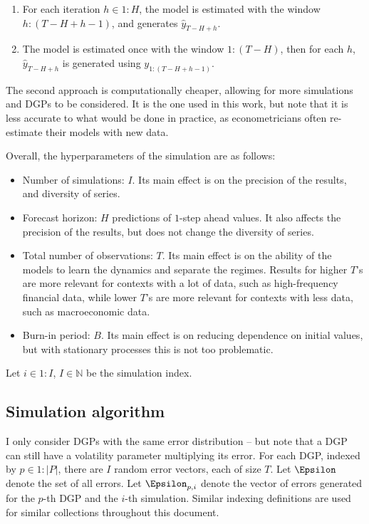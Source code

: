 \documentclass[
  letterpaper,
  DIV=11,
  numbers=noendperiod]{scrartcl}
\providecommand{\tightlist}{%
  \setlength{\itemsep}{0pt}\setlength{\parskip}{0pt}}\usepackage{longtable,booktabs,array}
\numberwithin{equation}{section}
\numberwithin{table}{section}
\numberwithin{figure}{section}
\begin{document}
\begin{enumerate}
\def\labelenumi{\arabic{enumi}.}
\tightlist
\item
  For each iteration \(h \in 1:H\), the model is estimated with the
  window \(h:(T-H+h-1)\), and generates \(\hat{y}_{T-H+h}\).
\item
  The model is estimated once with the window \(1:(T-H)\), then for each
  \(h\), \(\hat{y}_{T-H+h}\) is generated using \(y_{1:(T-H+h-1)}\).
\end{enumerate}

The second approach is computationally cheaper, allowing for more
simulations and DGPs to be considered. It is the one used in this work,
but note that it is less accurate to what would be done in practice, as
econometricians often re-estimate their models with new data.

Overall, the hyperparameters of the simulation are as follows:

\begin{itemize}
\tightlist
\item
  Number of simulations: \(I\). Its main effect is on the precision of
  the results, and diversity of series.
\item
  Forecast horizon: \(H\) predictions of \(1\)-step ahead values. It
  also affects the precision of the results, but does not change the
  diversity of series.
\item
  Total number of observations: \(T\). Its main effect is on the ability
  of the models to learn the dynamics and separate the regimes. Results
  for higher \(T\)'s are more relevant for contexts with a lot of data,
  such as high-frequency financial data, while lower \(T\)'s are more
  relevant for contexts with less data, such as macroeconomic data.
\item
  Burn-in period: \(B\). Its main effect is on reducing dependence on
  initial values, but with stationary processes this is not too
  problematic.
\end{itemize}

Let \(i \in 1:I\), \(I \in \mathbb{N}\) be the simulation index.

\subsection{Simulation algorithm}\label{simulation-algorithm}

I only consider DGPs with the same error distribution -- but note that a
DGP can still have a volatility parameter multiplying its error. For
each DGP, indexed by \(p \in 1:|P|\), there are \(I\) random error
vectors, each of size \(T\). Let \(\Epsilon\) denote the set of all
errors. Let \(\Epsilon_{p, i}\) denote the vector of errors generated
for the \(p\)-th DGP and the \(i\)-th simulation. Similar indexing
definitions are used for similar collections throughout this document.
\end{document}
